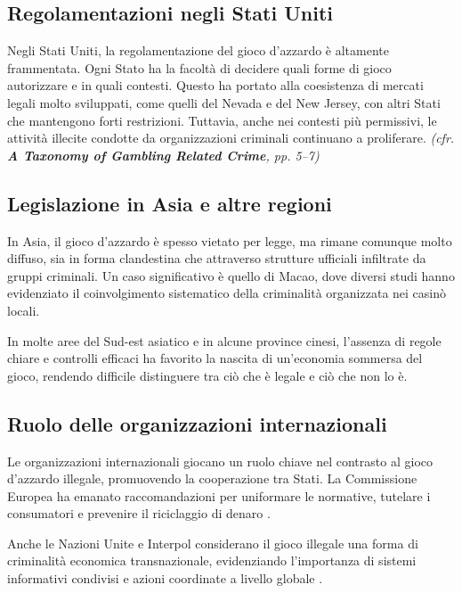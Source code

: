 \documentclass[a4paper,12pt]{article}
\begin{document}
\subsection{Regolamentazioni negli Stati Uniti}

Negli Stati Uniti, la regolamentazione del gioco d’azzardo è altamente frammentata. Ogni Stato ha la facoltà di decidere quali forme di gioco autorizzare e in quali contesti. Questo ha portato alla coesistenza di mercati legali molto sviluppati, come quelli del Nevada e del New Jersey, con altri Stati che mantengono forti restrizioni. Tuttavia, anche nei contesti più permissivi, le attività illecite condotte da organizzazioni criminali continuano a proliferare.
\textit{(cfr. \textbf{A Taxonomy of Gambling Related Crime}, pp. 5--7)} \cite{banks2018taxonomy}

\subsection{Legislazione in Asia e altre regioni}

In Asia, il gioco d’azzardo è spesso vietato per legge, ma rimane comunque molto diffuso, sia in forma clandestina che attraverso strutture ufficiali infiltrate da gruppi criminali. Un caso significativo è quello di Macao, dove diversi studi hanno evidenziato il coinvolgimento sistematico della criminalità organizzata nei casinò locali.

In molte aree del Sud-est asiatico e in alcune province cinesi, l’assenza di regole chiare e controlli efficaci ha favorito la nascita di un’economia sommersa del gioco, rendendo difficile distinguere tra ciò che è legale e ciò che non lo è.

\subsection{Ruolo delle organizzazioni internazionali}

Le organizzazioni internazionali giocano un ruolo chiave nel contrasto al gioco d’azzardo illegale, promuovendo la cooperazione tra Stati. La Commissione Europea ha emanato raccomandazioni per uniformare le normative, tutelare i consumatori e prevenire il riciclaggio di denaro \cite{lucchini2022socialcosts}.

Anche le Nazioni Unite e Interpol considerano il gioco illegale una forma di criminalità economica transnazionale, evidenziando l'importanza di sistemi informativi condivisi e azioni coordinate a livello globale \cite{banks2018taxonomy}.
\end{document}
